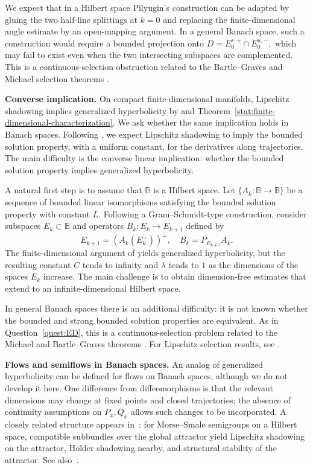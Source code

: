 \documentclass[12pt]{article}
\newcommand{\Bb}{\mathbb{B}}
\theoremstyle{definition}
\begin{document}
We expect that in a Hilbert space Pilyugin's construction \cite{PilCL} can be adapted by gluing the two half-line splittings at $k=0$ and replacing the finite-dimensional angle estimate by an open-mapping argument. In a general Banach space, such a construction would require a bounded projection onto
$
D=E^{s,+}_0\cap E^{u,-}_0,
$
which may fail to exist even when the two intersecting subspaces are complemented. This is a continuous-selection obstruction related to the Bartle--Graves and Michael selection theorems
\cite{BartleGraves1952,Michael1956I,Michael1956II}.

\smallskip

\textbf{Converse implication.} 
On compact finite-dimensional manifolds, Lipschitz shadowing implies generalized hyperbolicity by \cite{TikhLipSh} and Theorem~\ref{stat:finite-dimensional-characterization}. We ask whether the same implication holds in Banach spaces. Following \cite{TikhLipSh,TikhHolSh}, we expect Lipschitz shadowing to imply the bounded solution property, with a uniform constant, for the derivatives along trajectories. 
The main difficulty is the converse linear implication: whether the bounded solution property implies generalized hyperbolicity.

A natural first step is to assume that $\Bb$ is a Hilbert space. 
Let $\{A_k:\Bb\to\Bb\}$ be a sequence of bounded linear isomorphisms satisfying the bounded solution property with constant $L$. 
Following a Gram--Schmidt-type construction, consider subspaces $E_k\subset\Bb$ and operators $B_k:E_k\to E_{k+1}$ defined by
$$
E_{k+1} = \left(A_k(E_k^{\perp})\right)^{\perp}, \quad B_k = P_{E_{k+1}}A_k.
$$
The finite-dimensional argument of \cite[Lemma~4.2, Theorem~2.3]{TikhHolSh} yields generalized hyperbolicity, but the resulting constant $C$ tends to infinity and $\lambda$ tends to $1$ as the dimensions of the spaces $E_k$ increase. 
The main challenge is to obtain dimension-free estimates that extend to an infinite-dimensional Hilbert space.

In general Banach spaces there is an additional difficulty: it is not known whether the bounded and strong bounded solution properties are equivalent. 
As in Question~\ref{quest:ED}, this is a continuous-selection problem related to the Michael and Bartle--Graves theorems \cite{BartleGraves1952,Michael1956I,Michael1956II}. 
For Lipschitz selection results, see \cite{BorweinDontchev2003,Messerschmidt2019}.

\smallskip

\textbf{Flows and semiflows in Banach spaces.}
An analog of generalized hyperbolicity can be defined for flows on Banach spaces, although we do not develop it here. One difference from diffeomorphisms is that the relevant dimensions may change at fixed points and closed trajectories; the absence of continuity assumptions on $P_x,Q_x$ allows such changes to be incorporated. A closely related structure appears in~\cite{ACK2025}: for Morse--Smale semigroups on a Hilbert space, compatible subbundles over the global attractor yield Lipschitz shadowing on the attractor, H\"older shadowing nearby, and structural stability of the attractor. See also~\cite{BackesDragicevic2021}.
\end{document}
